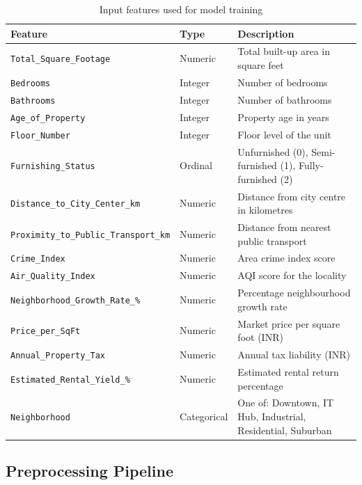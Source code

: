 \documentclass[12pt,a4paper]{article}
\begin{document}
\begin{table}[H]
\centering
\caption{Input features used for model training}
\begin{tabularx}{\linewidth}{llX}
\toprule
\textbf{Feature} & \textbf{Type} & \textbf{Description} \\
\midrule
\texttt{Total\_Square\_Footage}       & Numeric   & Total built-up area in square feet \\
\texttt{Bedrooms}                     & Integer   & Number of bedrooms \\
\texttt{Bathrooms}                    & Integer   & Number of bathrooms \\
\texttt{Age\_of\_Property}            & Integer   & Property age in years \\
\texttt{Floor\_Number}                & Integer   & Floor level of the unit \\
\texttt{Furnishing\_Status}           & Ordinal   & Unfurnished (0), Semi-furnished (1), Fully-furnished (2) \\
\texttt{Distance\_to\_City\_Center\_km} & Numeric & Distance from city centre in kilometres \\
\texttt{Proximity\_to\_Public\_Transport\_km} & Numeric & Distance from nearest public transport \\
\texttt{Crime\_Index}                 & Numeric   & Area crime index score \\
\texttt{Air\_Quality\_Index}          & Numeric   & AQI score for the locality \\
\texttt{Neighborhood\_Growth\_Rate\_\%} & Numeric & Percentage neighbourhood growth rate \\
\texttt{Price\_per\_SqFt}             & Numeric   & Market price per square foot (INR) \\
\texttt{Annual\_Property\_Tax}        & Numeric   & Annual tax liability (INR) \\
\texttt{Estimated\_Rental\_Yield\_\%} & Numeric   & Estimated rental return percentage \\
\texttt{Neighborhood}                 & Categorical & One of: Downtown, IT Hub, Industrial, Residential, Suburban \\
\bottomrule
\end{tabularx}
\end{table}

\subsection{Preprocessing Pipeline}
\end{document}
